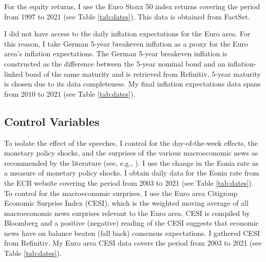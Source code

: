 For the equity returns, I use the Euro Stoxx 50 index returns covering the period from 1997 to 2021 (see Table \ref{tab:dates}). This data is obtained from FactSet.


I did not have access to the daily inflation expectations for the Euro area. For this reason, I take German 5-year breakeven inflation as a proxy for the Euro area’s inflation expectations. The German 5-year breakeven inflation is constructed as the difference between the 5-year nominal bond and an inflation-linked bond of the same maturity and is retrieved from Refinitiv. 5-year maturity is chosen due to its data completeness. My final inflation expectations data spans from 2010 to 2021 (see Table \ref{tab:dates}).


 

\subsection{Control Variables}
To isolate the effect of the speeches, I control for the day-of-the-week effects, the monetary policy shocks, and the surprises of the various macroeconomic news as recommended by the literature (see, e.g., \cite{ehrmann2007,rozkrut2007}). I use the change in the Eonia rate as a measure of monetary policy shocks. I obtain daily data for the Eonia rate from the ECB website covering the period from 2003 to 2021 (see Table \ref{tab:dates}). To control for the macroeconomic surprises, I use the Euro area Citigroup Economic Surprise Index (CESI), which is the weighted moving average of all macroeconomic news surprises relevant to the Euro area. CESI is compiled by Bloomberg and a positive (negative) reading of the CESI suggests that economic news have on balance beaten (fall back) consensus expectations. I gathered CESI from Refinitiv. My Euro area CESI data covers the period from 2003 to 2021 (see Table \ref{tab:dates}).

